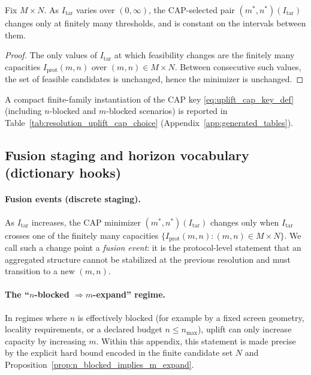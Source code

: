 \begin{corollary}\label{cor:uplift_fusion_thresholds_finite}
Fix $M\times N$.
As $I_{\mathrm{tar}}$ varies over $(0,\infty)$, the CAP-selected pair $(m^\ast,n^\ast)(I_{\mathrm{tar}})$ changes only at finitely many thresholds, and is constant on the intervals between them.
\end{corollary}
\begin{proof}
The only values of $I_{\mathrm{tar}}$ at which feasibility changes are the finitely many capacities $I_{\mathrm{prot}}(m,n)$ over $(m,n)\in M\times N$.
Between consecutive such values, the set of feasible candidates is unchanged, hence the minimizer is unchanged.
\end{proof}

\begin{remark}\label{rem:uplift_cap_choice_table}
\AuditTag A compact finite-family instantiation of the CAP key \eqref{eq:uplift_cap_key_def} (including $n$-blocked and $m$-blocked scenarios) is reported in Table~\ref{tab:resolution_uplift_cap_choice} (Appendix~\ref{app:generated_tables}).
\end{remark}

\subsection{Fusion staging and horizon vocabulary (dictionary hooks)}
\label{subsec:uplift_fusion_horizon_hooks}

\paragraph{Fusion events (discrete staging).}
\InterfaceTag As $I_{\mathrm{tar}}$ increases, the CAP minimizer $(m^\ast,n^\ast)(I_{\mathrm{tar}})$ changes only when $I_{\mathrm{tar}}$ crosses one of the finitely many capacities $\{I_{\mathrm{prot}}(m,n):(m,n)\in M\times N\}$.
We call such a change point a \emph{fusion event}: it is the protocol-level statement that an aggregated structure cannot be stabilized at the previous resolution and must transition to a new $(m,n)$.

\paragraph{The ``$n$-blocked $\Rightarrow m$-expand'' regime.}
\InterfaceTag In regimes where $n$ is effectively blocked (for example by a fixed screen geometry, locality requirements, or a declared budget $n\le n_{\max}$), uplift can only increase capacity by increasing $m$.
Within this appendix, this statement is made precise by the explicit hard bound encoded in the finite candidate set $N$ and Proposition~\ref{prop:n_blocked_implies_m_expand}.

